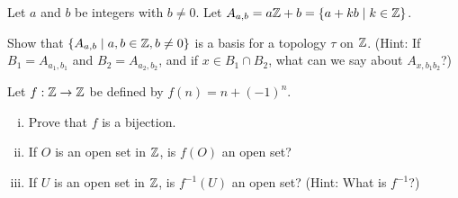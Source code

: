 \begin{comment}
So if $k \in a\Z \cap b\Z$, then $k \in m\Z \subseteq (a\Z \cap b\Z)$. Therefore, $\{a\Z \mid a \in \Z\}$ is a basis for a topology on $\Z$. 

\item The open sets are the unions of the basis elements $a \Z$ for $a \in \Z$. If $a = 0$, then $a \Z = \{0\}$. Otherwise, $a \Z$ contains negative integers. So the set of positive integers can not be realized as union of basis elements for $\tau$ and so is not an open set in the topological space $(\Z, \tau)$.

\item If $a \neq 0$, then $2a \in a\Z$ and so every non-zero basis element contains even numbers. So the set of odd integers can not be realized as union of basis elements for $\tau$ and so is not an open set in the topological space $(\Z, \tau)$.

\item Let $A = \{0\} \cup \{x \in Z \mid |x| \geq 5\}$, and let $O = \bigcup_{a \geq 5} a\Z$. Since $O$ is a union of basis sets, $O$ is open $(\Z, \tau)$. Now we show that $A = O$. Let $x \in A$. If $x \geq 0$, then $x = {x}(1)$, otherwise $x = |x|(-1)$. So $x \in |x|\Z \subset O$. Thus, $A \subseteq O$. Now let $y \in O$. Then $y \in a\Z$ for some $a \geq 5$. If $y = 0$, then $y \in A$. If $y \neq 0$, then  $y = ak$ for some nonzero integer $k$. It follows that $|y| = |ak| = |a||k| \geq |a| \geq 5$, and $y \in A$.  In either case, $y \in A$ and $O \subseteq A$. Therefore, $A = O$ and $A$ is open in $(\Z, \tau)$. 

\ea

\end{comment}

\item Let $a$ and $b$ be integers with $b \neq 0$. Let $A_{a,b} = a\mathbb{Z}+b = \{a + kb \mid k \in \mathbb{Z}\}$. 
	\ba
	\item Show that $\{A_{a,b} \mid a, b \in \mathbb{Z}, b \neq 0\}$ is a basis for a topology $\tau$ on $\mathbb{Z}$. (Hint: If $B_1 = A_{a_1,b_1}$ and $B_2 = A_{a_2,b_2}$, and if $x \in B_1 \cap B_2$, what can we say about $A_{x,b_1b_2}$?)
	
	\item Let $f : \mathbb{Z} \to \mathbb{Z}$ be defined by $f(n) = n + (-1)^n$. 
	
	\begin{enumerate}[i.]
	
	\item Prove that $f$ is a bijection.
	
	\item If $O$ is an open set in $\mathbb{Z}$, is $f(O)$ an open set?
	
	\item If $U$ is an open set in $\mathbb{Z}$, is $f^{-1}(U)$ an open set? (Hint: What is $f^{-1}$?)
	
	\end{enumerate}
	 
